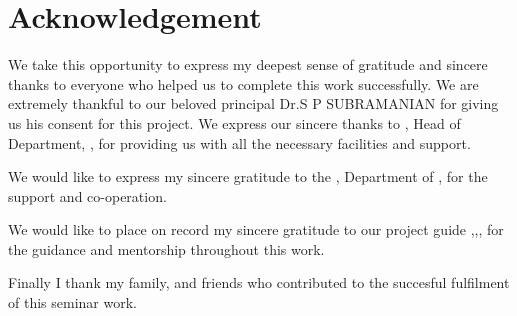 \chapter*{Acknowledgement}%
%



\par We take this opportunity to express my deepest sense of gratitude and sincere thanks to everyone who helped us to complete this work successfully. We are extremely thankful to our beloved principal {Dr.S P SUBRAMANIAN} for giving us his consent for this project. We express our sincere thanks to \hod, Head of Department, \dept, \college\hspace*{2pt} \collegeplace \hspace*{2pt} for providing  us with all the necessary facilities and support.\par

We would like to express my sincere gratitude to the \projcordinatorA, \hspace*{2pt} Department of \hspace*{2pt} \dept, \hspace*{2pt} \college \hspace*{2pt} \collegeplace \hspace*{2pt} for the support and co-operation.

We would like to place on record my sincere gratitude to our project guide \guide,\hspace*{2pt}\guidedes,\hspace*{2pt}\dept,\hspace*{2pt}\college \hspace*{2pt} %
for the guidance and mentorship throughout this work.

Finally I thank my family, and friends who contributed to the succesful fulfilment of this seminar work.

\vspace*{30pt}
\begin{flushright}
	\textbf{\studentA}\\
	\textbf{\studentB}\\
	\textbf{\studentC}\\
	\textbf{\studentD}\\
\end{flushright}
\thispagestyle{plain}
